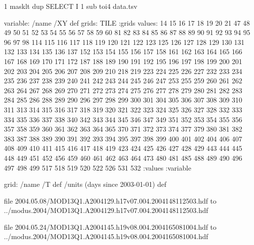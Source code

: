 1 masklt dup SELECT I 1 sub toi4 data.tsv
\begin{ingrid}
variable:
/name /XY def
grids: TILE :grids
values:
14	15	16	17	18	19	20	21	47	48	49	50	51	52	53	54	55	56	57	58	59	60	81	82	83	84	85	86	87	88	89	90	91	92	93	94	95	96	97	98	114	115	116	117	118	119	120	121	122	123	125	126	127	128	129	130	131	132	133	134	135	136	137	152	153	154	155	156	157	158	161	162	163	164	165	166	167	168	169	170	171	172	187	188	189	190	191	192	195	196	197	198	199	200	201	202	203	204	205	206	207	208	209	210	218	219	223	224	225	226	227	232	233	234	235	236	237	238	239	240	241	242	243	244	245	246	247	253	255	259	260	261	262	263	264	267	268	269	270	271	272	273	274	275	276	277	278	279	280	281	282	283	284	285	286	288	289	290	296	297	298	299	300	301	304	305	306	307	308	309	310	311	313	314	315	316	317	318	319	320	321	322	323	324	325	326	327	328	332	333	334	335	336	337	338	340	342	343	344	345	346	347	349	351	352	353	354	355	356	357	358	359	360	361	362	363	364	365	370	371	372	373	374	377	379	380	381	382	383	387	388	389	390	391	392	393	394	395	397	398	399	400	401	402	404	406	407	408	409	410	411	415	416	417	418	419	423	424	425	426	427	428	429	443	444	445	448	449	451	452	456	459	460	461	462	463	464	473	480	481	485	488	489	490	496	497	498	499	517	518	519	520	522	526	531	532
:values
:variable
\end{ingrid}
\begin{ingrid}
grid:
/name /T def
/units (days since 2003-01-01) def
\end{ingrid}
file 2004.05.08/MOD13Q1.A2004129.h17v07.004.2004148112503.hdf to  ../modus.2004/MOD13Q1.A2004129.h17v07.004.2004148112503.hdf

file 2004.05.24/MOD13Q1.A2004145.h19v08.004.2004165081004.hdf to  ../modus.2004/MOD13Q1.A2004145.h19v08.004.2004165081004.hdf

